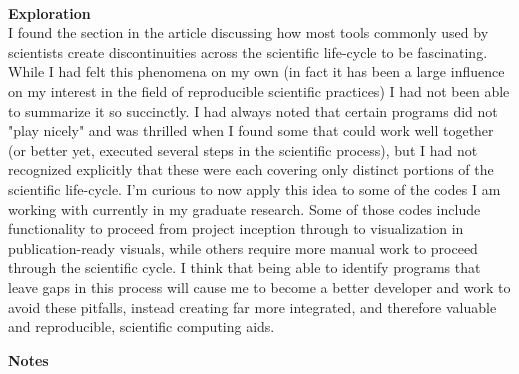 \documentclass{report}
\newcommand{\tab}{\-\hspace{1cm}}
\begin{document}
\-\\
\textbf{Exploration}\\
\tab I found the section in the article discussing how most tools commonly used by scientists create discontinuities across the scientific life-cycle to be fascinating. While I had felt this phenomena on my own (in fact it has been a large influence on my interest in the field of reproducible scientific practices) I had not been able to summarize it so succinctly. I had always noted that certain programs did not "play nicely" and was thrilled when I found some that could work well together (or better yet, executed several steps in the scientific process), but I had not recognized explicitly that these were each covering only distinct portions of the scientific life-cycle. I'm curious to now apply this idea to some of the codes I am working with currently in my graduate research. Some of those codes include functionality to proceed from project inception through to visualization in publication-ready visuals, while others require more manual work to proceed through the scientific cycle. I think that being able to identify programs that leave gaps in this process will cause me to become a better developer and work to avoid these pitfalls, instead creating far more integrated, and therefore valuable and reproducible, scientific computing aids.

\newpage

\textbf{Notes}\\
\end{document}
